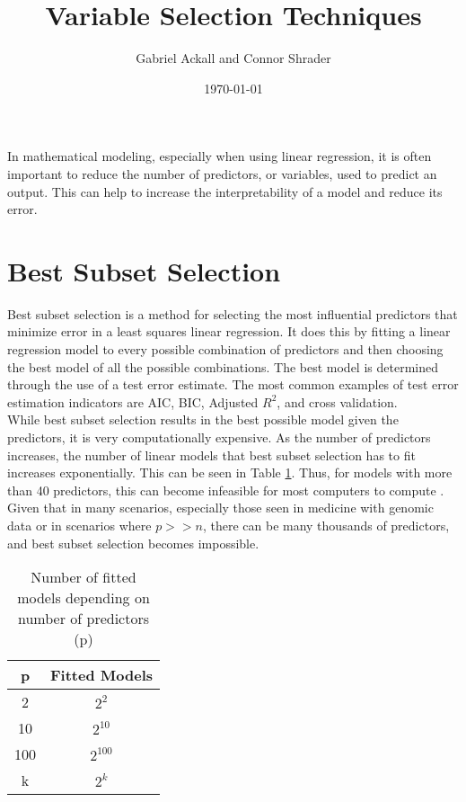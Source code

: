 \documentclass{article}
\title{Variable Selection Techniques}
\author{Gabriel Ackall and Connor Shrader}
\date{\today}
\begin{document}
\maketitle

In mathematical modeling, especially when using linear regression, it is often important to reduce the number of predictors, or variables, used to predict an output. This can help to increase the interpretability of a model and reduce its error.

\section{Best Subset Selection}
Best subset selection is a method for selecting the most influential predictors that minimize error in a least squares linear regression. It does this by fitting a linear regression model to every possible combination of predictors and then choosing the best model of all the possible combinations. The best model is determined through the use of a test error estimate. The most common examples of test error estimation indicators are AIC, BIC, Adjusted $R^2$, and cross validation.\\

While best subset selection results in the best possible model given the predictors, it is very computationally expensive. As the number of predictors increases, the number of linear models that best subset selection has to fit increases exponentially. This can be seen in Table \ref{tab:subset-combinations}. Thus, for models with more than 40 predictors, this can become infeasible for most computers to compute \cite{james2013introduction}. Given that in many scenarios, especially those seen in medicine with genomic data or in scenarios where $p>>n$, there can be many thousands of predictors, and best subset selection becomes impossible.

\begin{table}[h!]
	\centering
	\caption{Number of fitted models depending on number of predictors (p)}
	\vspace{0.1in}
	\begin{tabular}{c|c}
		\hline
		p  &  Fitted Models\\
		\hline
		2   & $2^2$ \\
		10  & $2^{10}$ \\
		100 & $2^{100}$ \\
		k   & $2^k$ \\
	\end{tabular}
\label{tab:subset-combinations}
\end{table}
\end{document}
